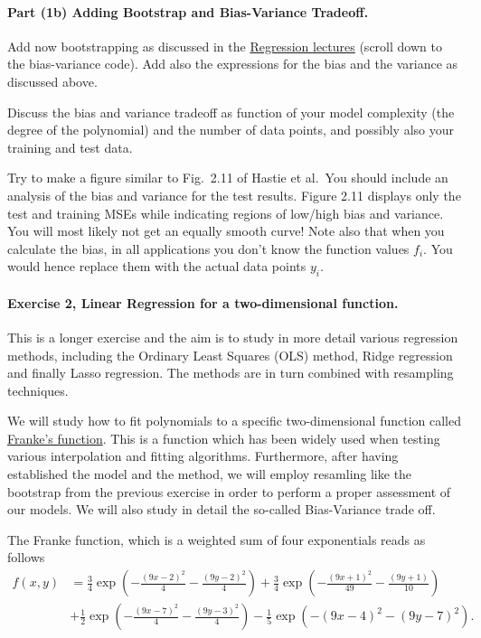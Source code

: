 \documentclass[%
oneside,                 %
final,                   %
10pt]{article}
\begin{document}
\paragraph{Part (1b) Adding Bootstrap and Bias-Variance Tradeoff.}
Add now bootstrapping as discussed in the \href{{https://compphysics.github.io/MachineLearningECT/doc/pub/Day1/html/Day1.html}}{Regression lectures} (scroll down to the bias-variance code).
Add also the expressions for the bias and the variance as discussed above.

Discuss the bias and variance tradeoff as function
of your model complexity (the degree of the polynomial) and the number
of data points, and possibly also your training and test data.

Try to make a figure similar to Fig.~2.11 of Hastie et al.~You should include an analysis of the bias and variance for the test results. Figure 2.11 displays only the test and training MSEs while indicating regions of low/high bias and variance. You will most likely not get an
equally smooth curve! Note also that when you calculate the bias, in all applications you don't know the function values $f_i$. You would hence replace them with the actual data points $y_i$.

\paragraph{Exercise 2, Linear Regression for  a two-dimensional function.}
This is a longer  exercise and the aim is to study in more detail various
regression methods, including the Ordinary Least Squares (OLS) method,
Ridge regression and finally Lasso regression.
The methods are in turn combined with resampling techniques.

We will study how to fit polynomials to a specific
two-dimensional function called \href{{http://www.dtic.mil/dtic/tr/fulltext/u2/a081688.pdf}}{Franke's
function}.  This
is a function which has been widely used when testing various
interpolation and fitting algorithms. Furthermore, after having
established the model and the method, we will employ resamling
like the bootstrap from the previous exercise in order to perform a
proper assessment of our models. We will also study in detail the
so-called Bias-Variance trade off.

The Franke function, which is a weighted sum of four exponentials  reads as follows
\begin{align*}
f(x,y) &= \frac{3}{4}\exp{\left(-\frac{(9x-2)^2}{4} - \frac{(9y-2)^2}{4}\right)}+\frac{3}{4}\exp{\left(-\frac{(9x+1)^2}{49}- \frac{(9y+1)}{10}\right)} \\
&+\frac{1}{2}\exp{\left(-\frac{(9x-7)^2}{4} - \frac{(9y-3)^2}{4}\right)} -\frac{1}{5}\exp{\left(-(9x-4)^2 - (9y-7)^2\right) }.
\end{align*}
\end{document}
